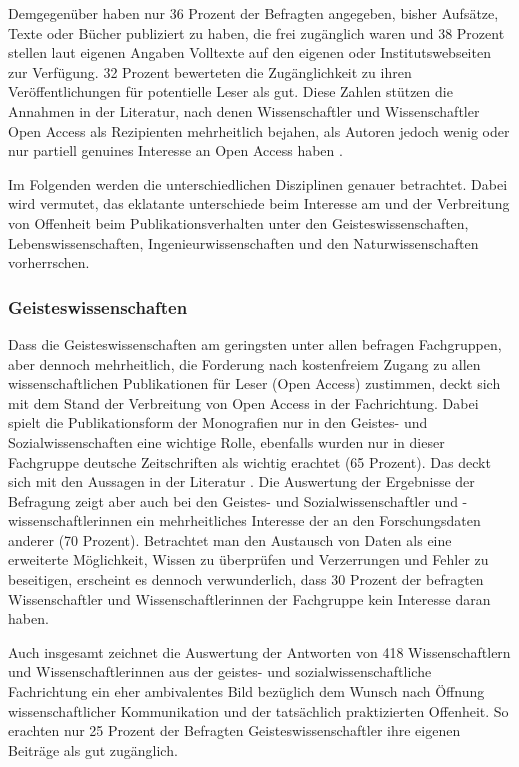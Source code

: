 Demgegenüber haben nur 36 Prozent der Befragten angegeben, bisher Aufsätze, Texte oder Bücher publiziert zu haben, die frei zugänglich waren und 38 Prozent stellen laut eigenen Angaben Volltexte auf den eigenen oder Institutswebseiten zur Verfügung. 32 Prozent bewerteten die Zugänglichkeit zu ihren Veröffentlichungen für potentielle Leser als gut. Diese Zahlen stützen die Annahmen in der Literatur, nach denen Wissenschaftler und Wissenschaftler Open Access als Rezipienten mehrheitlich bejahen, als Autoren jedoch wenig oder nur partiell genuines Interesse an Open Access haben \cite{wein_2010_erwerbung}.

Im Folgenden werden die unterschiedlichen Disziplinen genauer betrachtet. Dabei wird vermutet, das eklatante unterschiede beim Interesse am und der Verbreitung von Offenheit beim Publikationsverhalten unter den Geisteswissenschaften, Lebenswissenschaften, Ingenieurwissenschaften und den Naturwissenschaften vorherrschen.

\subsubsection{Geisteswissenschaften}

Dass die Geisteswissenschaften am geringsten unter allen befragen Fachgruppen, aber dennoch mehrheitlich, die Forderung nach kostenfreiem Zugang zu allen wissenschaftlichen Publikationen für Leser (Open Access) zustimmen, deckt sich mit dem Stand der Verbreitung von Open Access in der Fachrichtung. Dabei spielt die Publikationsform der Monografien nur in den Geistes- und Sozialwissenschaften eine wichtige Rolle, ebenfalls wurden nur in dieser Fachgruppe deutsche Zeitschriften als wichtig erachtet (65 Prozent). Das deckt sich mit den Aussagen in der Literatur \cite{hagner_2015_sache_buches} \cite{naeder_2010_open} \cite{hollricher_wandel_2009} \cite{Lossau_oa_2007}. Die Auswertung der Ergebnisse der Befragung zeigt aber auch bei den Geistes- und Sozialwissenschaftler und -wissenschaftlerinnen ein mehrheitliches Interesse der an den Forschungsdaten anderer (70 Prozent). Betrachtet man den Austausch von Daten als eine erweiterte Möglichkeit, Wissen zu überprüfen und Verzerrungen und Fehler zu beseitigen, erscheint es dennoch verwunderlich, dass 30 Prozent der befragten Wissenschaftler und Wissenschaftlerinnen der Fachgruppe kein Interesse daran haben.

Auch insgesamt zeichnet die Auswertung der Antworten von 418 Wissenschaftlern und Wissenschaftlerinnen aus der geistes- und sozialwissenschaftliche Fachrichtung ein eher ambivalentes Bild bezüglich dem Wunsch nach Öffnung wissenschaftlicher Kommunikation und der tatsächlich praktizierten Offenheit. So erachten nur 25 Prozent der Befragten Geisteswissenschaftler ihre eigenen Beiträge als gut zugänglich.

